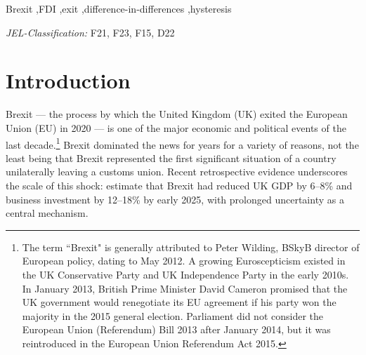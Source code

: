 \documentclass[preprint,11pt,authoryear]{elsarticle}
\begin{document}
\begin{frontmatter}
\begin{keyword}
Brexit \sep FDI \sep exit \sep difference-in-differences \sep hysteresis

\noindent
\textit{JEL-Classification:} F21, F23, F15, D22
\end{keyword}

\end{frontmatter}

\section{Introduction}
\label{sec:introduction}
Brexit --- the process by which the United Kingdom (UK) exited the European Union (EU) in 2020 --- is one of the major economic and political events of the last decade.\footnote{The term ``Brexit" is generally attributed to Peter Wilding, BSkyB director of European policy, dating to May 2012. A growing Euroscepticism existed in the UK Conservative Party and UK Independence Party in the early 2010s. In January 2013, British Prime Minister David Cameron promised that the UK government would renegotiate its EU agreement if his party won the majority in the 2015 general election. Parliament did not consider the European Union (Referendum) Bill 2013 after January 2014, but it was reintroduced in the European Union Referendum Act 2015.} Brexit dominated the news for years for a variety of reasons, not the least being that Brexit represented the first significant situation of a country unilaterally leaving a customs union. 
Recent retrospective evidence underscores the scale of this shock: \citet{bloom2025economic} estimate that Brexit had reduced UK GDP by 6--8\% and business investment by 12--18\% by early 2025, with prolonged uncertainty as a central mechanism.
\end{document}
